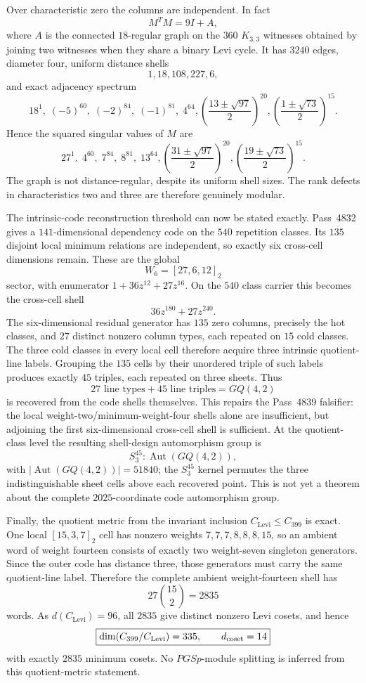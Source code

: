 Over characteristic zero the columns are independent.  In fact
\[
M^TM=9I+A,
\]
where $A$ is the connected $18$-regular graph on the $360$ $K_{3,3}$ witnesses obtained by joining two witnesses when they share a binary Levi cycle.  It has $3240$ edges, diameter four, uniform distance shells
\[
1,18,108,227,6,
\]
and exact adjacency spectrum
\[
18^1,\;(-5)^{60},\;(-2)^{84},\;(-1)^{81},\;4^{64},
\left(\frac{13\pm\sqrt{97}}2\right)^{20},
\left(\frac{1\pm\sqrt{73}}2\right)^{15}.
\]
Hence the squared singular values of $M$ are
\[
27^1,\;4^{60},\;7^{84},\;8^{81},\;13^{64},
\left(\frac{31\pm\sqrt{97}}2\right)^{20},
\left(\frac{19\pm\sqrt{73}}2\right)^{15}.
\]
The graph is not distance-regular, despite its uniform shell sizes.  The rank defects in characteristics two and three are therefore genuinely modular.

The intrinsic-code reconstruction threshold can now be stated exactly.  Pass~4832 gives a $141$-dimensional dependency code on the $540$ repetition classes.  Its $135$ disjoint local minimum relations are independent, so exactly six cross-cell dimensions remain.  These are the global
\[
W_6=[27,6,12]_2
\]
sector, with enumerator $1+36z^{12}+27z^{16}$.  On the $540$ class carrier this becomes the cross-cell shell
\[
36z^{180}+27z^{240}.
\]
The six-dimensional residual generator has $135$ zero columns, precisely the hot classes, and $27$ distinct nonzero column types, each repeated on $15$ cold classes.  The three cold classes in every local cell therefore acquire three intrinsic quotient-line labels.  Grouping the $135$ cells by their unordered triple of such labels produces exactly $45$ triples, each repeated on three sheets.  Thus
\[
\boxed{27\text{ line types}+45\text{ line triples}=GQ(4,2)}
\]
is recovered from the code shells themselves.  This repairs the Pass~4839 falsifier: the local weight-two/minimum-weight-four shells alone are insufficient, but adjoining the first six-dimensional cross-cell shell is sufficient.  At the quotient-class level the resulting shell-design automorphism group is
\[
\boxed{S_3^{45}:\operatorname{Aut}(GQ(4,2))},
\]
with $|\operatorname{Aut}(GQ(4,2))|=51840$; the $S_3^{45}$ kernel permutes the three indistinguishable sheet cells above each recovered point.  This is not yet a theorem about the complete $2025$-coordinate code automorphism group.

Finally, the quotient metric from the invariant inclusion $C_{\mathrm{Levi}}\le C_{399}$ is exact.  One local $[15,3,7]_2$ cell has nonzero weights $7,7,7,8,8,8,15$, so an ambient word of weight fourteen consists of exactly two weight-seven singleton generators.  Since the outer code has distance three, those generators must carry the same quotient-line label.  Therefore the complete ambient weight-fourteen shell has
\[
27\binom{15}{2}=2835
\]
words.  As $d(C_{\mathrm{Levi}})=96$, all $2835$ give distinct nonzero Levi cosets, and hence
\[
\boxed{\dim(C_{399}/C_{\mathrm{Levi}})=335,\qquad d_{\rm coset}=14}
\]
with exactly $2835$ minimum cosets.  No $PGSp$-module splitting is inferred from this quotient-metric statement.
